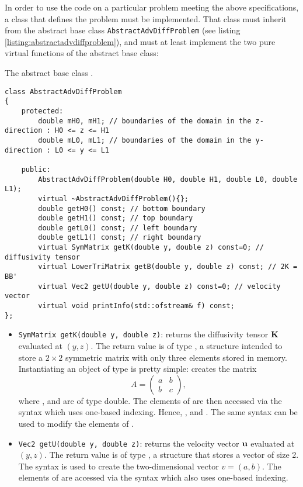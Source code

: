 In order to use the code on a particular problem meeting the above specifications, a class that defines the problem must be implemented. That class must inherit from the abstract base class \texttt{AbstractAdvDiffProblem} (see listing \ref{listing:abstractadvdiffproblem}), and must at least implement the two pure virtual functions of the abstract base class:
\begin{listing}[ht!]
\caption{The abstract base class .}
\label{listing:abstractadvdiffproblem}
\begin{verbatim}
class AbstractAdvDiffProblem
{
	protected:
		double mH0, mH1; // boundaries of the domain in the z-direction : H0 <= z <= H1
		double mL0, mL1; // boundaries of the domain in the y-direction : L0 <= y <= L1

	public:
		AbstractAdvDiffProblem(double H0, double H1, double L0, double L1);
		virtual ~AbstractAdvDiffProblem(){};
		double getH0() const; // bottom boundary
		double getH1() const; // top boundary 
		double getL0() const; // left boundary
		double getL1() const; // right boundary
		virtual SymMatrix getK(double y, double z) const=0; // diffusivity tensor
		virtual LowerTriMatrix getB(double y, double z) const; // 2K = BB'
		virtual Vec2 getU(double y, double z) const=0; // velocity vector
		virtual void printInfo(std::ofstream& f) const;
};
\end{verbatim}
\end{listing}
\begin{itemize}[nosep]
	\item \texttt{SymMatrix getK(double y, double z)}: returns the diffusivity tensor $\mathbf K$ evaluated at $(y,z)$. The return value is of type , a structure intended to store a $2\times 2$ symmetric matrix with only three elements stored in memory. Instantiating an object  of type  is pretty simple:  creates the matrix
	\[
		A = \begin{pmatrix} a & b \\ b & c \end{pmatrix},
	\] 
	where ,  and  are of type double. The elements of  are then accessed via the syntax  which uses one-based indexing. Hence, ,  and . The same syntax can be used to modify the elements of .
	\item \texttt{Vec2 getU(double y, double z)}: returns the velocity vector $\mathbf u$ evaluated at $(y,z)$. The return value is of type , a structure that stores a vector of size 2. The syntax  is used to create the two-dimensional vector $v = (a,b)$. The elements of  are accessed via the syntax  which also uses one-based indexing.
\end{itemize}
